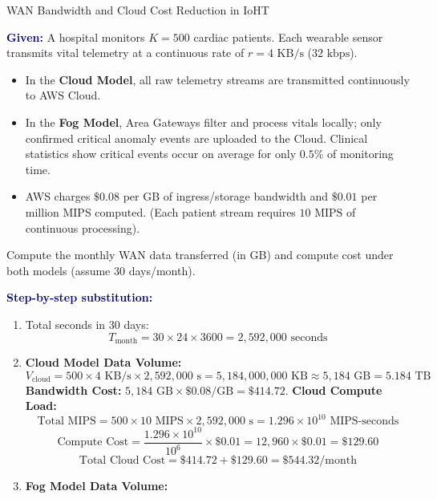 \documentclass[11pt,a4paper,openany]{report}
\newcommand{\Given}{\par\textbf{\textcolor{navy}{Given:}} }
\newcommand{\Steps}{\par\textbf{\textcolor{navy}{Step-by-step substitution:}}\par}
\begin{document}
\begin{solved}{WAN Bandwidth and Cloud Cost Reduction in IoHT}
\Given A hospital monitors $K = 500$ cardiac patients. Each wearable sensor transmits vital telemetry at a continuous rate of $r = 4\text{ KB/s}$ ($32\text{ kbps}$).
\begin{itemize}[leftmargin=*]
  \item In the \textbf{Cloud Model}, all raw telemetry streams are transmitted continuously to AWS Cloud.
  \item In the \textbf{Fog Model}, Area Gateways filter and process vitals locally; only confirmed critical anomaly events are uploaded to the Cloud. Clinical statistics show critical events occur on average for only $0.5\%$ of monitoring time.
  \item AWS charges $\$0.08$ per GB of ingress/storage bandwidth and $\$0.01$ per million MIPS computed. (Each patient stream requires $10\text{ MIPS}$ of continuous processing).
\end{itemize}
Compute the monthly WAN data transferred (in GB) and compute cost under both models (assume 30 days/month).
\Steps
\begin{enumerate}[leftmargin=*]
  \item Total seconds in 30 days:
  \begin{equation}
  T_{\text{month}} = 30 \times 24 \times 3600 = 2,592,000\text{ seconds}
  \end{equation}
  \item \textbf{Cloud Model Data Volume:}
  \begin{equation}
  V_{\text{cloud}} = 500 \times 4\text{ KB/s} \times 2,592,000\text{ s} = 5,184,000,000\text{ KB} \approx 5,184\text{ GB} = 5.184\text{ TB}
  \end{equation}
  \textbf{Bandwidth Cost:} $5,184\text{ GB} \times \$0.08/\text{GB} = \$414.72$.
  \textbf{Cloud Compute Load:}
  \begin{equation}
  \text{Total MIPS} = 500 \times 10\text{ MIPS} \times 2,592,000\text{ s} = 1.296 \times 10^{10}\text{ MIPS-seconds}
  \end{equation}
  \begin{equation}
  \text{Compute Cost} = \frac{1.296 \times 10^{10}}{10^6} \times \$0.01 = 12,960 \times \$0.01 = \$129.60
  \end{equation}
  \begin{equation}
  \text{Total Cloud Cost} = \$414.72 + \$129.60 = \$544.32/\text{month}
  \end{equation}
  \item \textbf{Fog Model Data Volume:}

\end{enumerate}
\end{solved}
\end{document}
